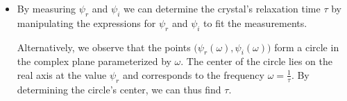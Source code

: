\documentclass[11pt, a4paper]{article}
\begin{document}
\begin{itemize}
	\item By measuring $ \psi_{r} $ and $ \psi_{i} $ we can determine the crystal's relaxation time $ \tau $ by manipulating the expressions for $ \psi_{r} $ and $ \psi_{i} $ to fit the measurements.
	
	
	Alternatively, we observe that the points $ \big(\psi_{r}(\omega), \psi_{i}(\omega) \big) $ form a circle in the complex plane parameterized by $ \omega $. The center of the circle lies on the real axis at the value $ \psi_{r} $ and corresponds to the frequency $ \omega = \frac{1}{\tau} $. By determining the circle's center, we can thus find $ \tau $.
\end{itemize}
\end{document}

